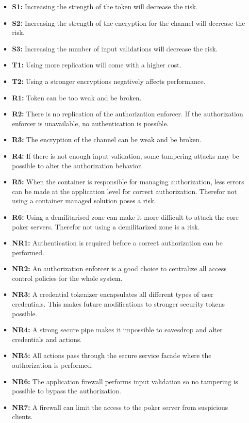\documentclass[a4paper,11pt]{report}
\begin{document}
\begin{itemize}
\item \textbf{S1:} Increasing the strength of the token will decrease the risk.
\item \textbf{S2:} Increasing the strength of the encryption for the channel will decrease the risk.
\item \textbf{S3:} Increasing the number of input validations will decrease the risk.
\item \textbf{T1:} Using more replication will come with a higher cost.
\item \textbf{T2:} Using a stronger encryptions negatively affects performance.
\item \textbf{R1:} Token can be too weak and be broken.
\item \textbf{R2:} There is no replication of the authorization enforcer. If the authorization enforcer is unavailable, no authentication is possible.
\item \textbf{R3:} The encryption of the channel can be weak and be broken.
\item \textbf{R4:} If there is not enough input validation, some tampering attacks may be possible to alter the authorization behavior.
\item \textbf{R5:} When the container is responsible for managing authorization, less errors can be made at the application level for correct authorization. Therefor not using a container managed solution poses a risk.
\item \textbf{R6:} Using a demilitarised zone can make it more difficult to attack the core poker servers. Therefor not using a demilitarized zone is a risk.
\item \textbf{NR1:} Authentication is required before a correct authorization can be performed.
\item \textbf{NR2:} An authorization enforcer is a good choice to centralize all access control policies for the whole system.
\item \textbf{NR3:} A credential tokenizer encapsulates all different types of user credentials. This makes future modifications to stronger security tokens possible.
\item \textbf{NR4:} A strong secure pipe makes it impossible to eavesdrop and alter credentials and actions.
\item \textbf{NR5:} All actions pass through the secure service facade where the authorization is performed.
\item \textbf{NR6:} The application firewall performs input validation so no tampering is possible to bypass the authorization.
\item \textbf{NR7:} A firewall can limit the access to the poker server from suspicious clients.
\end{itemize}
\end{document}
